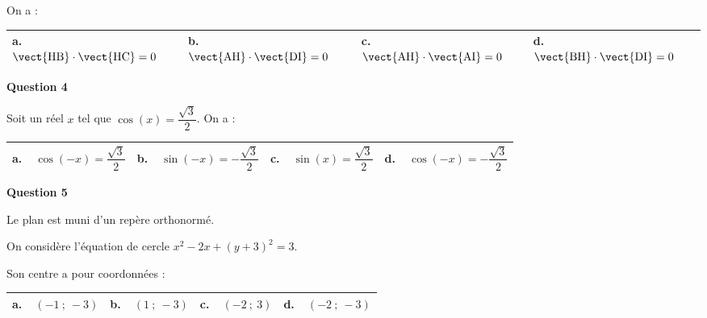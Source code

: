 On a :

\begin{center}
\begin{tabularx}{\linewidth}{|*{4}{X|}}\hline
\textbf{a.~~}$\vect{\text{HB}} \cdot \vect{\text{HC}} = 0$ &\textbf{b.~~}$\vect{\text{AH}} \cdot \vect{\text{DI}} = 0$&\textbf{c.~~}$\vect{\text{AH}} \cdot \vect{\text{AI}} = 0$&\textbf{d.~~}$\vect{\text{BH}} \cdot \vect{\text{DI}} = 0$\rule[-3mm]{0mm}{9mm}\\ \hline
\end{tabularx}
\end{center}

\medskip

\textbf{Question 4}

\medskip

Soit un réel $x$ tel que $\cos (x) = \dfrac{\sqrt{3}}{2}$. On a :

\begin{center}
\begin{tabularx}{\linewidth}{|*{4}{X|}}\hline
\textbf{a.~~}$\cos (-x) = \dfrac{\sqrt{3}}{2}$ &\textbf{b.~~}$\sin (- x) = - \dfrac{\sqrt{3}}{2}$&\textbf{c.~~}$\sin (x) = \dfrac{\sqrt{3}}{2}$&\textbf{d.~~}$\cos (- x) = - \dfrac{\sqrt{3}}{2}$\rule[-3mm]{0mm}{9mm}\\ \hline
\end{tabularx}
\end{center}

\medskip

\textbf{Question 5}

\medskip

Le plan est muni d'un repère orthonormé.

On considère l'équation de cercle $x^2 - 2x + (y + 3)^2 = 3$. 

Son centre a pour coordonnées :

\begin{center}
\begin{tabularx}{\linewidth}{|*{4}{X|}}\hline
\textbf{a.~~}$(-1~;~-3)$ &\textbf{b.~~}$(1~;~-3)$&\textbf{c.~~}$(-2~;~3)$&\textbf{d.~~}$(-2~;~-3)$\\ \hline
\end{tabularx}
\end{center}

\bigskip

